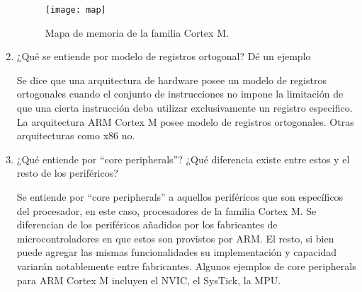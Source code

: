 \documentclass[12pt, a4paper]{article}
\makeatletter
\newcommand\setItemnumber[1]{\setcounter{enum\romannumeral\@enumdepth}{\numexpr#1-1\relax}}
\makeatother
\begin{document}
\begin{enumerate}
    \begin{figure}[!ht]
        \centering
        \texttt{[image: map]}
        \caption{Mapa de memoria de la familia Cortex M.}
        \label{fig:map}
    \end{figure}
    
    \setItemnumber{7}
    \item ¿Qué se entiende por modelo de registros ortogonal? Dé un ejemplo
    
    Se dice que una arquitectura de hardware posee un modelo de registros ortogonales 
    cuando el conjunto de instrucciones no impone la limitación de que una cierta instrucción
    deba utilizar exclusivamente un registro especifico. La arquitectura ARM Cortex M posee
    modelo de registros ortogonales. Otras arquitecturas como x86 no.
    
    \setItemnumber{12}
    \item ¿Qué entiende por ``core peripherals''? ¿Qué diferencia existe entre estos y 
    el resto de los periféricos?
    
    Se entiende por ``core peripherals'' a aquellos periféricos que son específicos del 
    procesador, en este caso, procesadores de la familia Cortex M. Se diferencian de los 
    periféricos añadidos por los fabricantes de microcontroladores en que estos son provistos 
    por ARM. El resto, si bien puede agregar las mismas funcionalidades su implementación y capacidad
    variarán notablemente entre fabricantes. Algunos ejemplos de core peripherals para ARM Cortex M 
    incluyen el NVIC, el SysTick, la MPU.
\end{enumerate}
\end{document}
